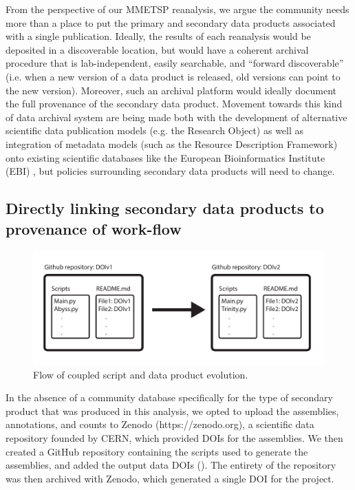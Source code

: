 \documentclass[12pt]{article}
\begin{document}
From the perspective of our MMETSP reanalysis, we argue the community needs more than a place to put the primary and secondary data products associated with a single publication. Ideally, the results of each reanalysis would be deposited in a discoverable location, but would have a coherent archival procedure that is lab-independent, easily searchable, and ``forward discoverable'' (i.e. when a  new version of a data product is released, old versions can point to the new version). Moreover, such an archival platform would ideally document the full provenance of the secondary data product. Movement towards this kind of data archival system are being made both with the development of alternative scientific data publication models (e.g. the Research Object\cite{Bechhofer2013}) as well as integration of metadata models (such as the Resource Description Framework) onto existing scientific databases like the European Bioinformatics Institute (EBI) \cite{Callahan2013}, but policies surrounding secondary data products will need to change.

\subsection{Directly linking secondary data products to provenance of work-flow}

\begin{figure}[h!]
  \centering
  \includegraphics[width=12cm]{Diagram.pdf}
  \caption{Flow of coupled script and data product evolution.}
  \label{FlowDiagram}
\end{figure}

In the absence of a community database specifically for the type of
secondary product that was produced in this analysis, we opted to
upload the assemblies, annotations, and counts to Zenodo
(https://zenodo.org), a scientific data repository founded by CERN,
which provided DOIs for the assemblies.  We then created a GitHub
repository containing the scripts used to generate the assemblies, and
added the output data DOIs ().  The entirety of the
repository was then archived with Zenodo, which generated a single DOI
for the project.
\end{document}
